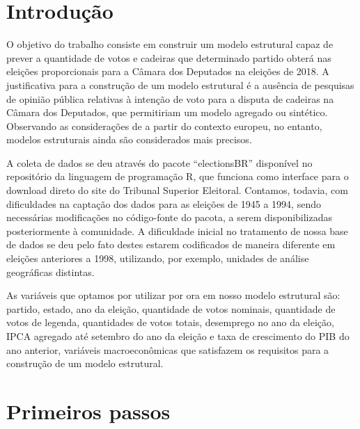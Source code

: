 \documentclass[
	article,			%
	11pt,				%
	oneside,			%
	a4paper,			%
	english,			%
	brazil,				%
	sumario=tradicional
	]{abntex2}
\begin{document}

\frenchspacing 

\maketitle


\textual

\section*{Introdução}

O objetivo do trabalho consiste em construir um modelo estrutural capaz de prever a quantidade de votos e cadeiras que determinado partido obterá nas eleições proporcionais para a Câmara dos Deputados na eleições de 2018. A justificativa para a construção de um modelo estrutural é a ausência de pesquisas de opinião pública relativas à intenção de voto para a disputa de cadeiras na Câmara dos Deputados, que permitiriam um modelo agregado ou sintético. Observando as considerações de  a partir do contexto europeu, no entanto, modelos estruturais ainda são considerados mais precisos.

A coleta de dados se deu através do pacote ``electionsBR'' disponível no repositório da linguagem de programação R, que funciona como interface para o download direto do site do Tribunal Superior Eleitoral. Contamos, todavia, com dificuldades na captação dos dados para as eleições de 1945 a 1994, sendo necessárias modificações no código-fonte do pacota, a serem disponibilizadas posteriormente à comunidade. A dificuldade inicial no tratamento de nossa base de dados se deu pelo fato destes estarem codificados de maneira diferente em eleições anteriores a 1998, utilizando, por exemplo, unidades de análise geográficas distintas.

As variáveis que optamos por utilizar por ora em nosso modelo estrutural são: partido, estado, ano da eleição, quantidade de votos nominais, quantidade de votos de legenda, quantidades de votos totais, desemprego no ano da eleição, IPCA agregado até setembro do ano da eleição e taxa de crescimento do PIB do ano anterior, variáveis macroeconômicas que satisfazem os requisitos para a construção de um modelo estrutural.

\section*{Primeiros passos}
\end{document}
